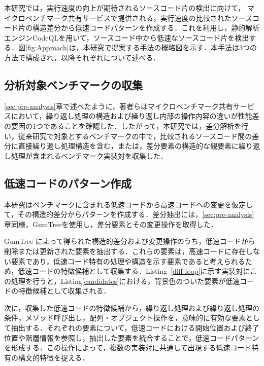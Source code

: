 \documentclass[submit,techrep,noauthor]{ipsj}
\newcommand{\memo}[1]{\colorbox{magenta!30}{{\bf MEMO}:}{\color{red!50} {\textbf{[#1]}}}}
\begin{document}
本研究では，実行速度の向上が期待されるソースコード片の検出に向けて，
マイクロベンチマーク共有サービスで提供される，実行速度の比較されたソースコード片の構造差分から低速コードパターンを作成する．これを利用し，静的解析エンジンCodeQLを用いて，ソースコード中から低速なソースコード片を検出する．図\ref{fig:Approach}は，本研究で提案する手法の概略図を示す．本手法は3つの方法で構成され，以降それぞれについて述べる．


\subsection{分析対象ベンチマークの収集}

\ref{sec:pre-analysis}章で述べたように，著者らはマイクロベンチマーク共有サービスにおいて，繰り返し処理の構造および繰り返し内部の操作内容の違いが性能差の要因の1つであることを確認した．したがって，本研究では，差分解析を行い，従来研究で対象とするベンチマークの中で，比較されるソースコード間の差分に直接繰り返し処理構造を含む，または，差分要素の構造的な親要素に繰り返し処理が含まれるベンチマーク実装対を収集した．


\subsection{低速コードのパターン作成}
本研究はベンチマークに含まれる低速コードから高速コードへの変更を仮定して，その構造的差分からパターンを作成する．差分抽出には，\ref{sec:pre-analysis}章同様，GumTreeを使用し，差分要素とその変更操作を取得した．

GumTree によって得られた構造的差分および変更操作のうち，低速コードから削除または更新された要素を抽出する．これらの要素は，高速コードに存在しない要素であり，低速コード特有の処理や構造を示す要素であると考えられるため，低速コードの特徴候補として収集する．Listing~\ref{diff-loop}に示す実装対にこの処理を行うと，Listing\ref{candidates}における，背景色のついた要素が低速コードの特徴候補として収集される．

次に，収集した低速コードの特徴候補から，繰り返し処理および繰り返し処理の条件，メソッド呼び出し，配列・オブジェクト操作を，意味的に有効な要素として抽出する．それぞれの要素について，低速コードにおける開始位置および終了位置や階層情報を参照し，抽出した要素を統合することで，低速コードパターンを形成する．この操作によって，複数の実装対に共通して出現する低速コード特有の構文的特徴を捉える．
\end{document}
